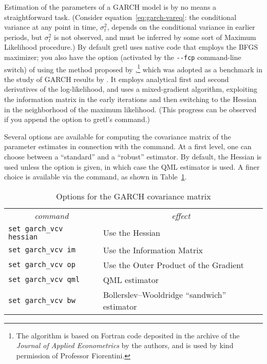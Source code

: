Estimation of the parameters of a GARCH model is by no means a
straightforward task.  (Consider equation~\ref{eq:garch-vareq}: the
conditional variance at any point in time, $\sigma^2_t$, depends on
the conditional variance in earlier periods, but $\sigma^2_t$ is not
observed, and must be inferred by some sort of Maximum Likelihood
procedure.)  By default gretl uses native code that employs the
BFGS maximizer; you also have the option (activated by the
\verb|--fcp| command-line switch) of using the method proposed by
\cite{fiorentini96},\footnote{The algorithm is based on Fortran code
  deposited in the archive of the \textit{Journal of Applied
    Econometrics} by the authors, and is used by kind permission of
  Professor Fiorentini.} which was adopted as a benchmark in the study
of GARCH results by \cite{mccullough98}.  It employs analytical first
and second derivatives of the log-likelihood, and uses a
mixed-gradient algorithm, exploiting the information matrix in the
early iterations and then switching to the Hessian in the neighborhood
of the maximum likelihood.  (This progress can be observed if you
append the  option to gretl's 
command.)

Several options are available for computing the covariance matrix of
the parameter estimates in connection with the  command.
At a first level, one can choose between a ``standard'' and a
``robust'' estimator.  By default, the Hessian is used unless the
 option is given, in which case the QML estimator is
used.  A finer choice is available via the  command, as
shown in Table~\ref{tab:garch-vcv}.

\begin{table}[htbp]
\caption{Options for the GARCH covariance matrix}
\label{tab:garch-vcv}
\begin{center}
\begin{tabular}{ll}
\multicolumn{1}{c}{\textit{command}} &
\multicolumn{1}{c}{\textit{effect}} \\ [4pt]
\texttt{set garch\_vcv hessian} & Use the Hessian \\
\texttt{set garch\_vcv im} & Use the Information Matrix \\
\texttt{set garch\_vcv op} & Use the Outer Product of the Gradient \\
\texttt{set garch\_vcv qml} & QML estimator \\
\texttt{set garch\_vcv bw} & Bollerslev--Wooldridge ``sandwich'' estimator
\end{tabular}
\end{center}
\end{table}

